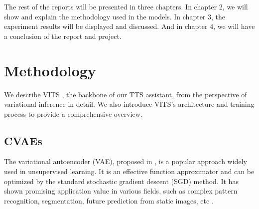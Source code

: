 \documentclass{article}
\begin{document}
The rest of the reports will be presented in three chapters. In chapter 2,  we will show and explain the methodology used in the models. In chapter 3, the experiment results will be displayed and discussed. And in chapter 4, we will have a conclusion of the report and project.
\section{Methodology}
\label{sec:method}

We describe VITS \cite{2021kim}, the backbone of our TTS assistant, from the perspective of variational inference in detail. We also introduce VITS's architecture and training process to provide a comprehensive overview.

\subsection{CVAEs}
The variational autoencoder (VAE), proposed in \cite{2022kingma}, is a popular approach widely used in unsupervised learning. It is an effective function approximator and can be optimized by the standard stochastic gradient descent (SGD) method. It has shown promising application value in various fields, such as complex pattern recognition, segmentation, future prediction from static images, etc \cite{2021doersch}.
\end{document}
